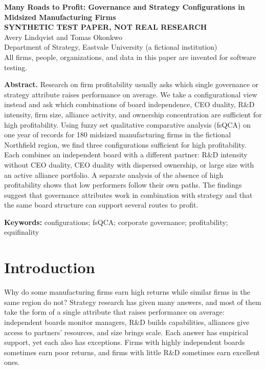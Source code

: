 \documentclass[11pt]{article}
\begin{document}
\begin{center}
{\Large\bfseries Many Roads to Profit: Governance and Strategy Configurations in Midsized Manufacturing Firms}\\[1.2em]
\textbf{SYNTHETIC TEST PAPER, NOT REAL RESEARCH}\\[1.2em]
Avery Lindqvist and Tomas Okonkwo\\
Department of Strategy, Eastvale University (a fictional institution)\\[0.6em]
\small All firms, people, organizations, and data in this paper are invented for software testing.
\end{center}

\vspace{1.5em}
\noindent\textbf{Abstract.} Research on firm profitability usually asks which single governance or strategy attribute raises performance on average. We take a configurational view instead and ask which combinations of board independence, CEO duality, R\&D intensity, firm size, alliance activity, and ownership concentration are sufficient for high profitability. Using fuzzy set qualitative comparative analysis (fsQCA) on one year of records for 180 midsized manufacturing firms in the fictional Northfield region, we find three configurations sufficient for high profitability. Each combines an independent board with a different partner: R\&D intensity without CEO duality, CEO duality with dispersed ownership, or large size with an active alliance portfolio. A separate analysis of the absence of high profitability shows that low performers follow their own paths. The findings suggest that governance attributes work in combination with strategy and that the same board structure can support several routes to profit.

\vspace{1em}
\noindent\textbf{Keywords:} configurations; fsQCA; corporate governance; profitability; equifinality

\clearpage
\section{Introduction}

Why do some manufacturing firms earn high returns while similar firms in the same region do not? Strategy research has given many answers, and most of them take the form of a single attribute that raises performance on average: independent boards monitor managers, R\&D builds capabilities, alliances give access to partners' resources, and size brings scale. Each answer has empirical support, yet each also has exceptions. Firms with highly independent boards sometimes earn poor returns, and firms with little R\&D sometimes earn excellent ones.
\end{document}
